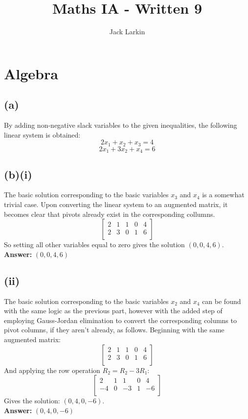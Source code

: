 \documentclass[11pt]{article}
\title{\textbf{Maths IA - Written 9}}
\date{}
\author{Jack Larkin}
\begin{document}
\maketitle
\section*{Algebra}
\subsection*{(a)}
By adding non-negative slack variables to the given inequalities, the following linear system is obtained:
$$2x_1+x_2+x_3=4$$
$$2x_1+3x_2+x_4=6$$
\subsection*{(b)(i)}
The basic solution corresponding to the basic variables $x_3$ and $x_4$ is a somewhat trivial case. Upon converting the linear system to an augmented matrix, it becomes clear that pivots already exist in the corresponding collumns. $$\begin{bmatrix}
2 & 1 & 1 & 0 & 4\\
2 & 3 & 0 & 1 & 6\\
\end{bmatrix}$$
So setting all other variables equal to zero gives the solution $(0, 0, 4, 6)$.\\
\textbf{Answer:} $(0, 0, 4, 6)$
\subsection*{(ii)}
The basic solution corresponding to the basic variables $x_2$ and $x_4$ can be found with the same logic as the previous part, however with the added step of employing Gauss-Jordan elimination to convert the corresponding columns to pivot columns, if they aren't already, as follows. Beginning with the same augmented matrix:
$$\begin{bmatrix}
2 & 1 & 1 & 0 & 4\\
2 & 3 & 0 & 1 & 6\\
\end{bmatrix}$$
And applying the row operation $R_2 = R_2 - 3R_1$:
$$\begin{bmatrix}
2 & 1 & 1 & 0 & 4\\
-4 & 0 & -3 & 1 & -6\\
\end{bmatrix}$$
Gives the solution: $(0,4,0,-6)$.\\
\textbf{Answer:} $(0,4,0,-6)$
\end{document}
